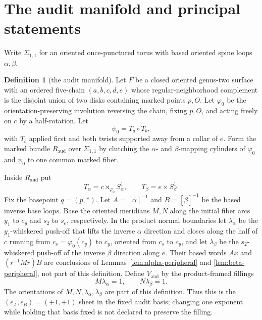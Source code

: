 \documentclass[11pt]{article}
\theoremstyle{definition}
\newtheorem{definition}[theorem]{Definition}
\begin{document}
\section{The audit manifold and principal statements}\label{sec:audit-object}

Write $\Sigma_{1,1}$ for an oriented once-punctured torus with based
oriented spine loops $\alpha,\beta$.

\begin{definition}[the audit manifold]\label{def:Vaudit}
Let $F$ be a closed oriented genus-two surface with an ordered five-chain
$(a,b,c,d,e)$ whose regular-neighborhood complement is the disjoint union of
two disks containing marked points $p,O$.  Let $\varphi_0$ be the
orientation-preserving involution reversing the chain, fixing $p,O$, and
acting freely on $c$ by a half-rotation.  Let
\[
 \psi_0=T_a\circ T_b,
\]
with $T_b$ applied first and both twists supported away from a collar of $e$.
Form the marked bundle $R_{\mathrm{aud}}$ over $\Sigma_{1,1}$ by clutching
the $\alpha$- and $\beta$-mapping cylinders of $\varphi_0$ and $\psi_0$ to
one common marked fiber.

Inside $R_{\mathrm{aud}}$ put
\[
 T_\alpha=c\rtimes_{\varphi_0}S^1_\alpha,
 \qquad T_\beta=e\times S^1_\beta.
\]
Fix the basepoint $q=(p,*)$.  Let $A=[\bar\alpha]^{-1}$ and
$B=[\bar\beta]^{-1}$ be the based inverse base loops.  Base the oriented
meridians $M,N$ along the initial fiber arcs $y_1$ to $c_y$ and $s_2$ to
$s_e$, respectively.  In the product normal boundaries let
$\lambda_\alpha$ be the $y_1$-whiskered push-off that lifts the inverse
$\alpha$ direction and closes along the half of $c$ running from
$c_s=\varphi_0(c_y)$ to $c_y$, oriented from $c_s$ to $c_y$, and let
$\lambda_\beta$ be the $s_2$-whiskered push-off of the inverse $\beta$
direction along $e$.  Their based words $Ax$ and $(r^{-1}Mr)B$ are
conclusions of Lemmas~\ref{lem:alpha-peripheral} and
\ref{lem:beta-peripheral}, not part of this definition.  Define
$V_{\mathrm{aud}}$ by the product-framed fillings
\[
 M\lambda_\alpha=1,\qquad N\lambda_\beta=1.
\]
The orientations of $M,N,\lambda_\alpha,\lambda_\beta$ are part of this
definition.  Thus this is the $(\epsilon_A,\epsilon_B)=(+1,+1)$ sheet in the
fixed audit basis; changing one exponent while holding that basis fixed is
not declared to preserve the filling.
\end{definition}
\end{document}
